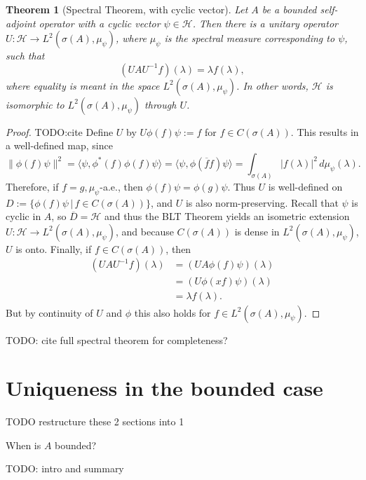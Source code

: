 \documentclass[12pt,oneside]{report}
\newtheorem{thm}{Theorem}[chapter]
\begin{document}
\begin{thm}[Spectral Theorem, with cyclic vector]\label{spectral-mo}
    Let $A$ be a bounded self-adjoint operator with a cyclic vector $\psi \in \mathscr{H}$. Then there is a unitary operator $U: \mathscr{H} \to L^{2}(\sigma(A),\mu_{\psi})$, where $\mu_{\psi}$ is the spectral measure corresponding to $\psi$, such that $$(UAU^{-1}f)(\lambda) = \lambda f(\lambda),$$where equality is meant in the space $L^{2}(\sigma(A),\mu_{\psi})$. In other words, $\mathscr{H}$ is isomorphic to $L^2(\sigma(A),\mu_\psi)$ through $U$.
\end{thm}
\begin{proof}
    TODO:cite Define $U$ by $U\phi(f)\psi := f$ for $f \in C(\sigma(A))$. This results in a well-defined map, since $$\|\phi(f)\psi\|^{2} = \langle \psi, \phi^{*}(f)\phi(f)\psi \rangle = \langle \psi, \phi(\overline{f}f)\psi \rangle = \int _{\sigma(A)} |f(\lambda)|^{2} \, d\mu_{\psi}(\lambda).$$ Therefore, if $f=g, \mu_{\psi}$-a.e., then $\phi(f)\psi = \phi(g)\psi$. Thus $U$ is well-defined on $D := \{ \phi(f)\psi \, | \, f \in C(\sigma(A)) \}$, and $U$ is also norm-preserving. Recall that $\psi$ is cyclic in $A$, so $\overline{D} = \mathscr{H}$ and thus the BLT Theorem yields an isometric extension $U: \mathscr{H} \to L^{2}(\sigma(A), \mu_{\psi})$, and because $C(\sigma(A))$ is dense in $L^{2}(\sigma(A),\mu_{\psi})$, $U$ is onto. Finally, if $f \in C(\sigma(A))$, then \begin{align*}
        (UAU^{-1}f)(\lambda) &= (UA\phi(f)\psi)(\lambda) \\
        &= (U\phi(xf)\psi)(\lambda) \\
        &= \lambda f(\lambda).
    \end{align*} But by continuity of $U$ and $\phi$ this also holds for $f \in L^{2}(\sigma(A),\mu_{\psi})$.
\end{proof}

TODO: cite full spectral theorem for completeness?

\chapter{Uniqueness in the bounded case}

TODO restructure these 2 sections into 1

 When is $A$ bounded?

TODO: intro and summary
\end{document}
